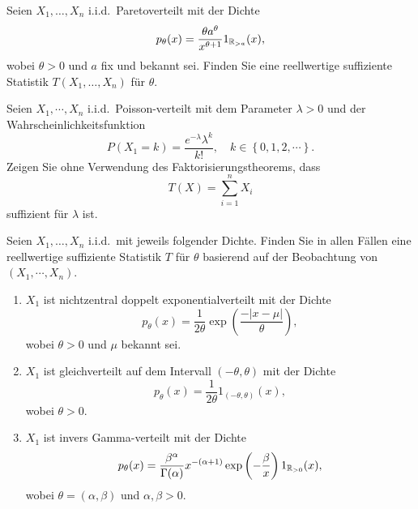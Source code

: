 Seien $X_1,\ldots,X_n$ i.i.d.\ Paretoverteilt mit der Dichte
\begin{equation*}
    p_\theta(x)= \frac{\theta a^\theta}{x^{\theta+1}}1_{\mathbb R_{>a}}(x),
\end{equation*}
wobei $\theta>0$ und $a$ fix und bekannt sei. Finden Sie eine reellwertige
suffiziente Statistik $T(X_1,\ldots,X_n)$ für $\theta$.


Seien $X_1,\cdots, X_n$ i.i.d.\ Poisson-verteilt mit dem Parameter $\lambda>0$ 
und der Wahrscheinlichkeitsfunktion 
\begin{equation*}
    P(X_1=k) = \frac{e^{-\lambda}\lambda^k}{k!}, \quad k\in \left\{ 0,1,2,\cdots \right\}.
\end{equation*}
Zeigen Sie ohne Verwendung des Faktorisierungstheorems, dass 
\begin{equation*}
    T(X) = \sum_{i=1}^{n} X_i
\end{equation*}
suffizient für $\lambda$ ist. 



Seien $X_1,\ldots,X_n$ i.i.d.\ mit jeweils folgender Dichte. Finden Sie in
allen Fällen eine reellwertige suffiziente Statistik $T$ für $\theta$ basierend
auf der Beobachtung von $(X_1, \cdots, X_n)$. 
\begin{enumerate}
	\item $X_1$ ist nichtzentral doppelt exponentialverteilt mit der Dichte 
        \begin{equation*}
            p_\theta (x) = \frac{1}{2\theta} \exp \left( \frac{-|x-\mu|}{\theta} \right),
        \end{equation*}
        wobei $\theta >0$ und $\mu$ bekannt sei.
	\item $X_1$ ist gleichverteilt auf dem Intervall $(-\theta,\theta)$ mit der Dichte 
        \begin{equation*}
            p_\theta (x) = \frac{1}{2\theta} 1_{\left( -\theta ,\theta \right)}(x),
        \end{equation*}
        wobei $\theta >0$.
	\item $X_1$ ist invers Gamma-verteilt mit der Dichte 
        \begin{equation*}
            p_\theta (x) = \frac{\beta^\alpha}{\Gamma(\alpha)} x^{- (\alpha+1)} 
            \exp\left(  -\frac{\beta}{x} \right) 1_{\mathbb R_{>0}}(x), 
        \end{equation*}
        wobei $\theta = (\alpha, \beta)$ und $\alpha, \beta > 0$.
\end{enumerate}

